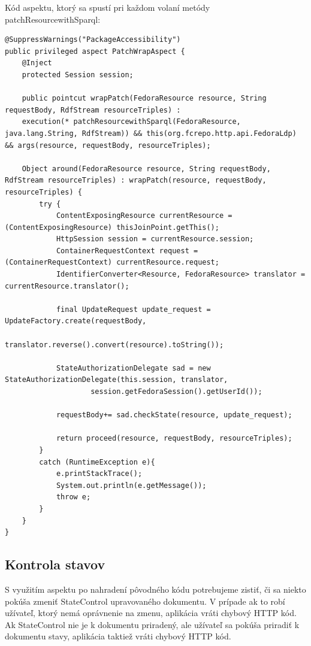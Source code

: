 \documentclass[thesis=M,slovak]{FITthesis}[2013/05/06]
\begin{document}
Kód aspektu, ktorý sa spustí pri každom volaní metódy patchResourcewithSparql:
\lstset{language=Java}
\begin{lstlisting}[frame=single] 
@SuppressWarnings("PackageAccessibility")
public privileged aspect PatchWrapAspect {
    @Inject
    protected Session session;

    public pointcut wrapPatch(FedoraResource resource, String requestBody, RdfStream resourceTriples) :
    execution(* patchResourcewithSparql(FedoraResource, java.lang.String, RdfStream)) && this(org.fcrepo.http.api.FedoraLdp) && args(resource, requestBody, resourceTriples);

    Object around(FedoraResource resource, String requestBody, RdfStream resourceTriples) : wrapPatch(resource, requestBody, resourceTriples) {
        try {
            ContentExposingResource currentResource = (ContentExposingResource) thisJoinPoint.getThis();
            HttpSession session = currentResource.session;
            ContainerRequestContext request = (ContainerRequestContext) currentResource.request;
            IdentifierConverter<Resource, FedoraResource> translator = currentResource.translator();

            final UpdateRequest update_request = UpdateFactory.create(requestBody,
                    translator.reverse().convert(resource).toString());

            StateAuthorizationDelegate sad = new StateAuthorizationDelegate(this.session, translator,
                    session.getFedoraSession().getUserId());

            requestBody+= sad.checkState(resource, update_request);

            return proceed(resource, requestBody, resourceTriples);
        }
        catch (RuntimeException e){
            e.printStackTrace();
            System.out.println(e.getMessage());
            throw e;
        }
    }
}
\end{lstlisting}

\subsection{Kontrola stavov}
S využitím aspektu po nahradení pôvodného kódu potrebujeme zistiť, či sa niekto pokúša zmeniť StateControl upravovaného dokumentu. V prípade ak to robí užívateľ, ktorý nemá oprávnenie na zmenu, aplikácia vráti chybový HTTP kód.
Ak StateControl nie je k dokumentu priradený, ale užívateľ sa pokúša priradiť k dokumentu stavy, aplikácia taktiež vráti chybový HTTP kód.
\end{document}

